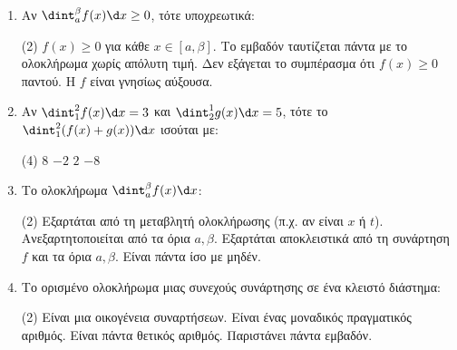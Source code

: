 \begin{enumerate}[label=\textbf{3.\arabic*.}, itemsep=4mm]
    \item Αν $\dint_a^\beta f(x)\d x \ge 0$, τότε υποχρεωτικά:
    \begin{tasks}[label=\let\textdexiakeraia\relax\alph*.](2)
        \task $f(x) \ge 0$ για κάθε $x \in [a, \beta]$.
        \task Το εμβαδόν ταυτίζεται πάντα με το ολοκλήρωμα χωρίς απόλυτη τιμή.
        \task Δεν εξάγεται το συμπέρασμα ότι $f(x) \ge 0$ παντού.
        \task Η $f$ είναι γνησίως αύξουσα.
    \end{tasks}

    \item Αν $\dint_1^2 f(x) \d x = 3$ και $\dint_2^1 g(x) \d x = 5$, τότε το $\dint_1^2 (f(x) + g(x)) \d x$ ισούται με:
    \begin{tasks}[label=\let\textdexiakeraia\relax\alph*.](4)
        \task $8$
        \task $-2$
        \task $2$
        \task $-8$
    \end{tasks}

    \item Το ολοκλήρωμα $\dint_a^\beta f(x) \d x$:
    \begin{tasks}[label=\let\textdexiakeraia\relax\alph*.](2)
        \task Εξαρτάται από τη μεταβλητή ολοκλήρωσης (π.χ. αν είναι $x$ ή $t$).
        \task Ανεξαρτητοποιείται από τα όρια $a, \beta$.
        \task Εξαρτάται αποκλειστικά από τη συνάρτηση $f$ και τα όρια $a, \beta$.
        \task Είναι πάντα ίσο με μηδέν.
    \end{tasks}

    \item Το ορισμένο ολοκλήρωμα μιας συνεχούς συνάρτησης σε ένα κλειστό διάστημα:
    \begin{tasks}[label=\let\textdexiakeraia\relax\alph*.](2)
        \task Είναι μια οικογένεια συναρτήσεων.
        \task Είναι ένας μοναδικός πραγματικός αριθμός.
        \task Είναι πάντα θετικός αριθμός.
        \task Παριστάνει πάντα εμβαδόν.
    \end{tasks}

\end{enumerate}